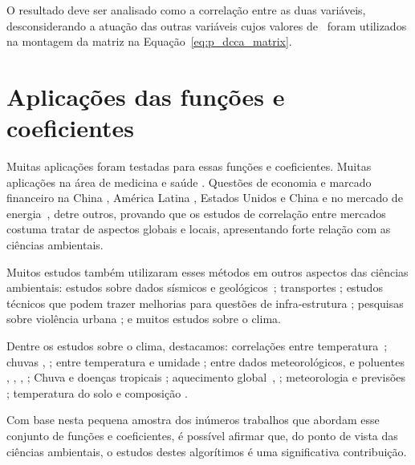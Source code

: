 O resultado deve ser analisado como a correlação entre as duas variáveis, desconsiderando a atuação das outras variáveis cujos valores de \pdcca~foram utilizados na montagem da matriz na Equação~\ref{eq:p_dcca_matrix}.

\section{Aplicações das funções e coeficientes}
\label{ss:aplica}

Muitas aplicações foram testadas para essas funções e coeficientes. Muitas aplicações na área de medicina e saúde \cite{CHEN2018171, FILHO2023128802, GE2023114155, GHOSH2018392}. Questões de economia e marcado financeiro na China \cite{LI2024123716}, América Latina \cite{CONTRERASREYES2024130115}, Estados Unidos e China \cite{CHEN2024e36537} e no mercado de energia~\cite{ASLAM2024102085}, detre outros, provando que os estudos de correlação entre mercados costuma tratar de aspectos globais e locais, apresentando forte relação com as ciências ambientais.

Muitos estudos também utilizaram esses métodos em outros aspectos das ciências ambientais: estudos sobre dados sísmicos \cite{shadkhooMultifractalDetrendedCrosscorrelation2009} e geológicos~\cite{BIANCHI2018377, QIN2024108559}; transportes \cite{SHI2018165, ZEBENDE20111677, ZEBENDE20094863}; estudos técnicos que podem trazer melhorias para questões de infra-estrutura \cite{RODRIGUESSANTOS2018294}; pesquisas sobre violência urbana \cite{MACHADOFILHO201412}; e muitos estudos sobre o clima.

Dentre os estudos sobre o clima, destacamos: correlações entre temperatura~\cite{YU2019122034}; chuvas \cite{ADARSH2020124913}, \cite{LI2024131535}; entre temperatura e umidade \cite{ZEBENDE201817}; entre dados meteorológicos, e poluentes \cite{SHI2014130}, \cite{HE201747}, \cite{ZHANG2015114}, \cite{SHEN2015417}; Chuva e doenças tropicais \cite{OLIVEIRA2023160491}; aquecimento global~\cite{CHATTERJEE2021125815}, \cite{YUAN201471}; meteorologia e previsões \cite{AFUECHETA2021100295, SHIN2019778}; temperatura do solo e composição \cite{KAR2019236}.

Com base nesta pequena amostra dos inúmeros trabalhos que abordam esse conjunto de funções e coeficientes, é possível afirmar que, do ponto de vista das ciências ambientais, o estudos destes algorítimos é uma significativa contribuição.




